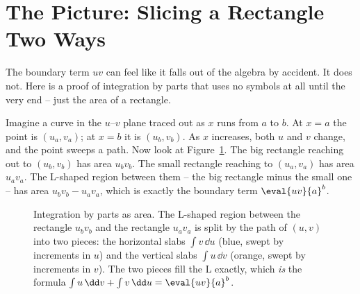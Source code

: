 \section{The Picture: Slicing a Rectangle Two Ways}
\label{ch23:picture}

The boundary term $uv$ can feel like it falls out of the algebra by accident. It
does not. Here is a proof of integration by parts that uses no symbols at all
until the very end -- just the area of a rectangle.

Imagine a curve in the $u$--$v$ plane traced out as $x$ runs from $a$ to $b$. At
$x=a$ the point is $(u_a, v_a)$; at $x=b$ it is $(u_b, v_b)$. As $x$ increases,
both $u$ and $v$ change, and the point sweeps a path. Now look at
Figure~\ref{ch23:fig-rectangle}. The big rectangle reaching out to $(u_b,v_b)$
has area $u_b v_b$. The small rectangle reaching to $(u_a,v_a)$ has area
$u_a v_a$. The L-shaped region between them -- the big rectangle minus the small
one -- has area $u_b v_b - u_a v_a$, which is exactly the boundary term
$\eval{uv}{a}^{b}$.

\begin{figure}[H]
\centering
{}
\caption{Integration by parts as area. The L-shaped region between the rectangle
$u_b v_b$ and the rectangle $u_a v_a$ is split by the path of $(u,v)$ into two
pieces: the horizontal slabs $\int v\,\dd u$ (blue, swept by increments in $u$)
and the vertical slabs $\int u\,\dd v$ (orange, swept by increments in $v$). The
two pieces fill the L exactly, which \emph{is} the formula
$\int u\,\dd v + \int v\,\dd u = \eval{uv}{a}^{b}$.}
\label{ch23:fig-rectangle}
\end{figure}

